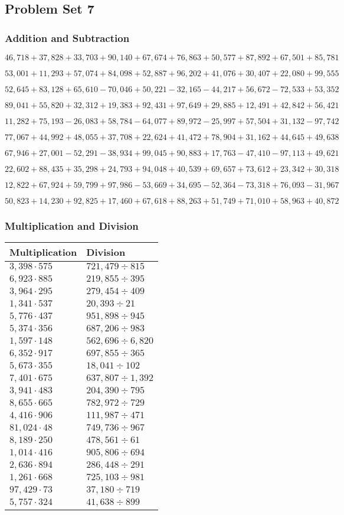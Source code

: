 \hypertarget{problem-set-7-4}{%
\subsection{Problem Set 7}\label{problem-set-7-4}}

\hypertarget{addition-and-subtraction-229}{%
\subsubsection{Addition and
Subtraction}\label{addition-and-subtraction-229}}

\(46,718+37,828+33,703+90,140+67,674+76,863+50,577+87,892+67,501+ 85,781\)

\(53,001+11,293+57,074+84,098+52,887+96,202+41,076+30,407+22,080+99,555\)

\(52,645+83,128+65,610-70,046+50,221-32,165-44,217+56,672-72,533+53,352\)

\(89,041+55,820+32,312+19,383+92,431+97,649+29,885+12,491+42,842+56,421\)

\(11,282+75,193-26,083+58,784-64,077+89,972-25,997+57,504+31,132-97,742\)

\(77,067+44,992+48,055+37,708+22,624+41,472+78,904+31,162+44,645+49,638\)

\(67,946+27,001-52,291-38,934+99,045+90,883+17,763-47,410-97,113+49,621\)

\(22,602+88,435+35,298+24,793+94,048+40,539+69,657+73,612+23,342+30,318\)

\(12,822+67,924+59,799+97,986-53,669+34,695-52,364-73,318+76,093-31,967\)

\(50,823+14,230+92,825+17,460+67,618+88,263+51,749+71,010+58,963+40,872\)

\hypertarget{multiplication-and-division-228}{%
\subsubsection{Multiplication and
Division}\label{multiplication-and-division-228}}

\begin{longtable}[]{@{}ll@{}}
\toprule
Multiplication & Division\tabularnewline
\midrule
\endhead
\(3,398\cdot575\) & \(721,479 ÷815\)\tabularnewline
\(6,923\cdot885\) & \(219,855÷395\)\tabularnewline
\(3,964\cdot295\) & \(279,454÷409\)\tabularnewline
\(1,341\cdot537\) & \(20,393÷21\)\tabularnewline
\(5,776\cdot437\) & \(951,898÷945\)\tabularnewline
\(5,374\cdot356\) & \(687,206÷983\)\tabularnewline
\(1,597\cdot148\) & \(562,696÷6,820\)\tabularnewline
\(6,352\cdot917\) & \(697,855÷365\)\tabularnewline
\(5,673\cdot355\) & \(18,041÷102\)\tabularnewline
\(7,401\cdot675\) & \(637,807÷1,392\)\tabularnewline
\(3,941\cdot483\) & \(204,390÷795\)\tabularnewline
\(8,655\cdot665\) & \(782,972÷729\)\tabularnewline
\(4,416\cdot906\) & \(111,987÷471\)\tabularnewline
\(81,024\cdot48\) & \(749,736÷967\)\tabularnewline
\(8,189\cdot250\) & \(478,561÷61\)\tabularnewline
\(1,014\cdot416\) & \(905,806÷694\)\tabularnewline
\(2,636\cdot894\) & \(286,448÷291\)\tabularnewline
\(1,261\cdot668\) & \(725,103÷981\)\tabularnewline
\(97,429\cdot73\) & \(37,180÷719\)\tabularnewline
\(5,757\cdot324\) & \(41,638÷899\)\tabularnewline
\bottomrule
\end{longtable}

